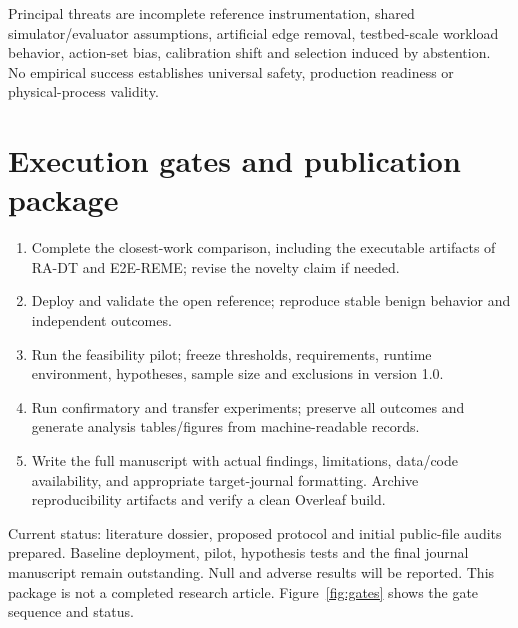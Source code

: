 ﻿\documentclass[sigconf,nonacm]{acmart}
\begin{document}
Principal threats are incomplete reference instrumentation, shared simulator/evaluator assumptions, artificial edge removal, testbed-scale workload behavior, action-set bias, calibration shift and selection induced by abstention. No empirical success establishes universal safety, production readiness or physical-process validity.

\section{Execution gates and publication package}
\begin{enumerate}
\item Complete the closest-work comparison, including the executable artifacts of RA-DT and E2E-REME; revise the novelty claim if needed.
\item Deploy and validate the open reference; reproduce stable benign behavior and independent outcomes.
\item Run the feasibility pilot; freeze thresholds, requirements, runtime environment, hypotheses, sample size and exclusions in version 1.0.
\item Run confirmatory and transfer experiments; preserve all outcomes and generate analysis tables/figures from machine-readable records.
\item Write the full manuscript with actual findings, limitations, data/code availability, and appropriate target-journal formatting. Archive reproducibility artifacts and verify a clean Overleaf build.
\end{enumerate}
Current status: literature dossier, proposed protocol and initial public-file audits prepared. Baseline deployment, pilot, hypothesis tests and the final journal manuscript remain outstanding. Null and adverse results will be reported. This package is not a completed research article. Figure~\ref{fig:gates} shows the gate sequence and status.
\end{document}
